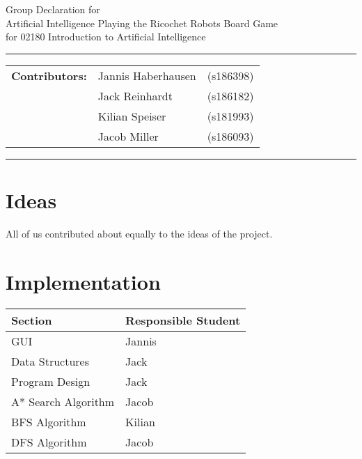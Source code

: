 \documentclass[a4paper,10pt]{article}
\begin{document}
\begin{center}
Group Declaration for\\
\vspace{0.5cm}
{{\Large \sc Artificial Intelligence Playing the Ricochet Robots Board Game}}\\
\vspace{0.5cm} for 02180 Introduction to Artificial Intelligence
\end{center}
\rule{\textwidth}{0.5pt}
\begin{description}
\item\begin{tabular}{rll}
    \textbf{Contributors:}& Jannis Haberhausen &(s186398)\\ & Jack Reinhardt &(s186182)\\ & Kilian Speiser &(s181993)\\ & Jacob Miller &(s186093) \\
\end{tabular}
\end{description}
\rule{\textwidth}{1pt}

\section*{\large{Ideas}}
All of us contributed about equally to the ideas of the project.


\section*{\large{Implementation}}
\begin{table}[!ht]
\centering
\begin{tabular}{l|l} \hline
    \textbf{Section} & \textbf{Responsible Student} \\ \hline
    GUI & Jannis \\
    Data Structures & Jack \\
    Program Design & Jack \\
    A* Search Algorithm & Jacob \\
    BFS Algorithm & Kilian \\
    DFS Algorithm & Jacob \\
\end{tabular}
\end{table}
\end{document}
